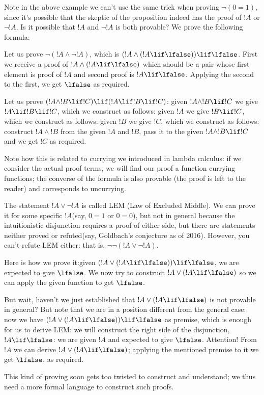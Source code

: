 \documentclass[../../../include/open-logic-section]{subfiles}
\begin{document}
Note in the above example we can't use the same trick when proving $\lnot (0=1)$,
since it's possible that the skeptic of the proposition indeed has
the proof of $!A$ or $\lnot !A$. Is it possible that $!A$ and $\lnot
!A$ is both provable? We prove the following formula:

\begin{ex}
Let us prove $\lnot(!A \land \lnot !A)$, which is $(!A \land (!A \lif \lfalse))
\lif \lfalse$. First we receive a proof of $!A \land (!A \lif \lfalse)$
which should be a pair whose first element is proof of $!A$ and second
proof is $!A \lif \lfalse$. Applying the second to the first, we get
$\lfalse$ as required.
\end{ex}

\begin{ex}
Let us prove $(!A \land !B \lif !C) \lif (!A \lif !B \lif !C)$: given $!A \land !B
\lif !C$ we give $!A \lif !B \lif !C$, which we construct as
follows: given $!A$ we give $!B \lif !C$, which we construct
as follows: given $!B$ we give $!C$, which we construct as follows:
construct $!A \land !B$ from the given $!A$ and $!B$, pass it to the
given $!A \land !B \lif !C$ and we get $!C$ as required.
\end{ex}

Note how this is related to currying we introduced in lambda
calculus: if we consider the actual proof terms, we will find our
proof a function currying functions; the converse of the formula is also
provable (the proof is left to the reader) and corresponds to uncurrying.

The statement $!A \lor \lnot !A$ is called LEM (Law of Excluded
Middle). We can prove it for some specific $!A$(say,
$0=1$ or $0=0$), but not in general because the
intuitionistic disjunction requires a proof of either side, but there
are statements neither proved or refuted(say, Goldbach's conjecture as
of 2016). However, you can't refute LEM either: that is, $\lnot
\lnot (!A \lor \lnot !A)$.

\begin{ex}
  Here is how we prove it:given $(!A \lor (!A \lif \lfalse))\lif \lfalse$, we are expected to give $\lfalse$. We
now try to construct $!A \lor (!A \lif \lfalse)$ so we can apply the given
function to get $\lfalse$.

But wait, haven't we just established that $!A \lor (!A \lif \lfalse)$
is not provable in general? But note that we are in a
position different from the general case: now we have $(!A \lor (!A \lif \lfalse))\lif \lfalse$
as premise, which is enough for us to derive LEM: we will construct the right side of the
disjunction, $!A \lif \lfalse$: we are given $!A$ and expected to give
$\lfalse$. Attention! From $!A$ we can derive $!A \lor (!A \lif
\lfalse)$; applying the mentioned premise to it we get 
$\lfalse$, as required.
\end{ex}

This kind of proving soon gets too twisted to construct and understand;
we thus need a more formal language to construct such proofs.
\end{document}
